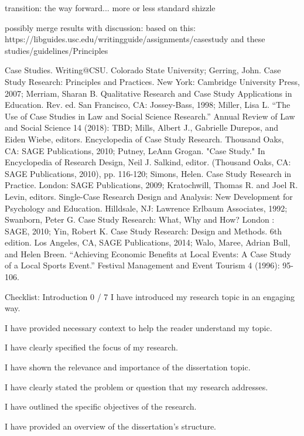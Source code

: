 transition: the way forward...
more or less standard shizzle

possibly merge results with discussion: based on this: https://libguides.usc.edu/writingguide/assignments/casestudy and these studies/guidelines/Principles



Case Studies. Writing@CSU. Colorado State University; Gerring, John. Case Study Research: Principles and Practices. New York: Cambridge University Press, 2007; Merriam, Sharan B. Qualitative Research and Case Study Applications in Education. Rev. ed. San Francisco, CA: Jossey-Bass, 1998; Miller, Lisa L. “The Use of Case Studies in Law and Social Science Research.” Annual Review of Law and Social Science 14 (2018): TBD; Mills, Albert J., Gabrielle Durepos, and Eiden Wiebe, editors. Encyclopedia of Case Study Research. Thousand Oaks, CA: SAGE Publications, 2010; Putney, LeAnn Grogan. "Case Study." In Encyclopedia of Research Design, Neil J. Salkind, editor. (Thousand Oaks, CA: SAGE Publications, 2010), pp. 116-120; Simons, Helen. Case Study Research in Practice. London: SAGE Publications, 2009; Kratochwill, Thomas R. and Joel R. Levin, editors. Single-Case Research Design and Analysis: New Development for Psychology and Education. Hilldsale, NJ: Lawrence Erlbaum Associates, 1992; Swanborn, Peter G. Case Study Research: What, Why and How? London : SAGE, 2010; Yin, Robert K. Case Study Research: Design and Methods. 6th edition. Los Angeles, CA, SAGE Publications, 2014; Walo, Maree, Adrian Bull, and Helen Breen. “Achieving Economic Benefits at Local Events: A Case Study of a Local Sports Event.” Festival Management and Event Tourism 4 (1996): 95-106.




Checklist: Introduction 0 / 7
I have introduced my research topic in an engaging way.

I have provided necessary context to help the reader understand my topic.

I have clearly specified the focus of my research.

I have shown the relevance and importance of the dissertation topic.

I have clearly stated the problem or question that my research addresses.

I have outlined the specific objectives of the research.

I have provided an overview of the dissertation’s structure.